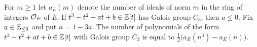 \begin{theorem}

\label{thm:exactFormula}


\leanok



 For $m\geq1$ let $a_E(m)$ denote the number of ideals of norm $m$ in the ring of integers $\mathcal{O}_E$ of $E$. If $t^3-t^2+at+b\in\mathbb{Z}[t]$ has Galois group $C_3$, then $a\leq0$. Fix $a \in \mathbb{Z}_{\leq 0}$ and put $n=1-3a$. The number of polynomials of the form $t^3 -t^2 + at + b \in \mathbb{Z}[t]$ with Galois group $C_3$ is equal to $\tfrac{1}{2}\big(a_E(n^3)-a_E(n)\big)$. 

\end{theorem}

